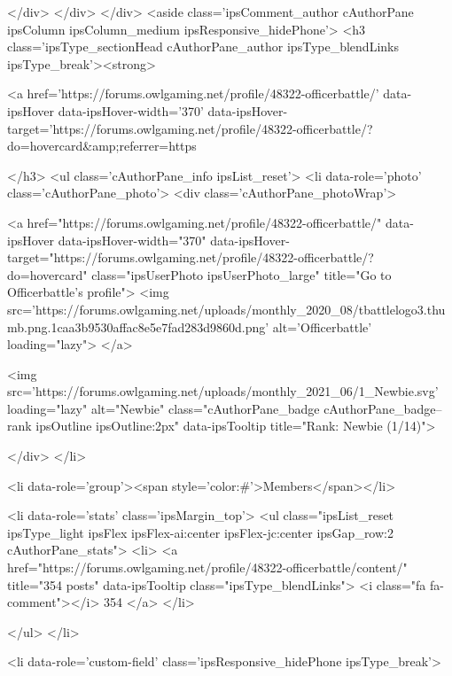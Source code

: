 			</div>
		</div>
	</div>
	<aside class='ipsComment_author cAuthorPane ipsColumn ipsColumn_medium ipsResponsive_hidePhone'>
		<h3 class='ipsType_sectionHead cAuthorPane_author ipsType_blendLinks ipsType_break'><strong>


<a href='https://forums.owlgaming.net/profile/48322-officerbattle/' data-ipsHover data-ipsHover-width='370' data-ipsHover-target='https://forums.owlgaming.net/profile/48322-officerbattle/?do=hovercard&amp;referrer=https%
			
		</h3>
		<ul class='cAuthorPane_info ipsList_reset'>
			<li data-role='photo' class='cAuthorPane_photo'>
				<div class='cAuthorPane_photoWrap'>
					


	<a href="https://forums.owlgaming.net/profile/48322-officerbattle/" data-ipsHover data-ipsHover-width="370" data-ipsHover-target="https://forums.owlgaming.net/profile/48322-officerbattle/?do=hovercard" class="ipsUserPhoto ipsUserPhoto_large" title="Go to Officerbattle's profile">
		<img src='https://forums.owlgaming.net/uploads/monthly_2020_08/tbattlelogo3.thumb.png.1caa3b9530affac8e5e7fad283d9860d.png' alt='Officerbattle' loading="lazy">
	</a>

					
					
						
<img src='https://forums.owlgaming.net/uploads/monthly_2021_06/1_Newbie.svg' loading="lazy" alt="Newbie" class="cAuthorPane_badge cAuthorPane_badge--rank ipsOutline ipsOutline:2px" data-ipsTooltip title="Rank: Newbie (1/14)">
					
				</div>
			</li>
			
				<li data-role='group'><span style='color:#'>Members</span></li>
				
			
			
				<li data-role='stats' class='ipsMargin_top'>
					<ul class="ipsList_reset ipsType_light ipsFlex ipsFlex-ai:center ipsFlex-jc:center ipsGap_row:2 cAuthorPane_stats">
						<li>
							<a href="https://forums.owlgaming.net/profile/48322-officerbattle/content/" title="354 posts" data-ipsTooltip class="ipsType_blendLinks">
								<i class="fa fa-comment"></i> 354
							</a>
						</li>
						
					</ul>
				</li>
			
			
				

	
	<li data-role='custom-field' class='ipsResponsive_hidePhone ipsType_break'>
		
